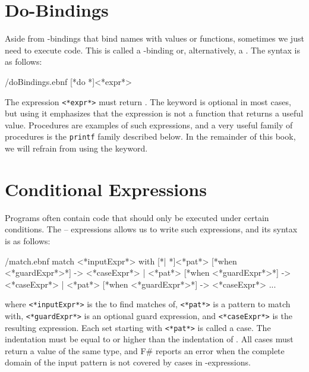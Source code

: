 \documentclass[fsharpNotes.tex]{subfiles}
\begin{document}

\section{Do-Bindings}
Aside from -bindings that bind names with values or functions, sometimes we just need to execute code. This is called a -binding or, alternatively, a . The syntax is as follows:
%
\begin{verbatimwrite}{\ebnf/doBindings.ebnf}
[*do *]<*expr*>
\end{verbatimwrite}
%
The expression \lstinline[language=syntax]{<*expr*>} must return . The keyword  is optional in most cases, but using it emphasizes that the expression is not a function that returns a useful value. Procedures are examples of such expressions, and a very useful family of procedures is the \lstinline{printf} family described below. In the remainder of this book, we will refrain from using the  keyword.

\section{Conditional Expressions}
Programs often contain code that should only be executed under certain conditions. The  --  expressions allows us to write such expressions, and its syntax is as follows:
%
\begin{verbatimwrite}{\ebnf/match.ebnf}
match <*inputExpr*> with 
 [*| *]<*pat*> [*when <*guardExpr*>*] -> <*caseExpr*> 
 | <*pat*> [*when <*guardExpr*>*] -> <*caseExpr*> 
 | <*pat*> [*when <*guardExpr*>*] -> <*caseExpr*> 
 ...
\end{verbatimwrite}
%
where \lstinline[language=syntax]{<*inputExpr*>} is the  to find matches of, \lstinline[language=syntax]{<*pat*>} is a pattern to match with, \lstinline[language=syntax]{<*guardExpr*>} is an optional guard expression, and \lstinline[language=syntax]{<*caseExpr*>} is the resulting expression. Each set starting with \lstinline[language=syntax]{<*pat*>} is called a case.  The indentation must be equal to or higher than the indentation of . All cases must return a value of the same type, and F\# reports an error when the complete domain of the input pattern is not covered by cases in -expressions.
\end{document}
